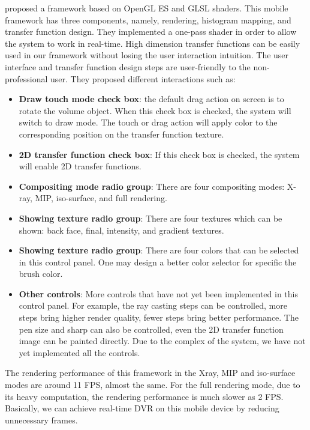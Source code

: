 \cite{7852799} proposed a framework based on OpenGL ES and GLSL shaders. This
mobile framework has three components, namely, rendering,
histogram mapping, and transfer function design. They
implemented a one-pass shader in order to allow the system to work in real-time. High dimension transfer functions can
be easily used in our framework without losing the user
interaction intuition. The user interface and transfer function
design steps are user-friendly to the non-professional user. They proposed different interactions such as:
\begin{itemize}
\item \textbf{Draw touch mode check box}: the default drag action
on screen is to rotate the volume object. When this
check box is checked, the system will switch to draw
mode. The touch or drag action will apply color to the
corresponding position on the transfer function texture.
\item \textbf{2D transfer function check box}: If this check box is
checked, the system will enable 2D transfer functions.
\item \textbf{Compositing mode radio group}: There are four
compositing modes: X-ray, MIP, iso-surface, and full
rendering.
\item \textbf{Showing texture radio group}: There are four textures
which can be shown: back face, final, intensity, and
gradient textures.
\item \textbf{Showing texture radio group}: There are four colors that can
be selected in this control panel. One may design a
better color selector for specific the brush color.
\item \textbf{Other controls}: More controls that have not yet been
implemented in this control panel. For example, the ray
casting steps can be controlled, more steps bring higher
render quality, fewer steps bring better performance. The
pen size and sharp can also be controlled, even the 2D
transfer function image can be painted directly. Due to the
complex of the system, we have not yet implemented all
the controls.
\end{itemize}
The rendering performance of this framework in the Xray,
MIP and iso-surface modes are around 11 FPS, almost
the same. For the full rendering mode, due to its heavy
computation, the rendering performance is much slower as 2
FPS. Basically, we can achieve real-time DVR on this mobile
device by reducing unnecessary frames.



